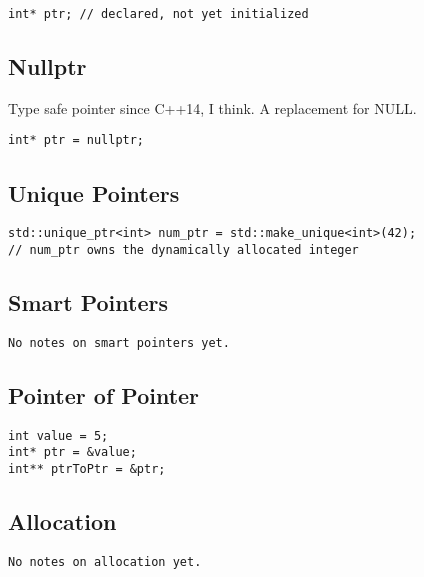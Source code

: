 \begin{verbatim}
int* ptr; // declared, not yet initialized
\end{verbatim}

\subsection{Nullptr}

Type safe pointer since C++14, I think. A replacement for NULL.

\begin{verbatim}
int* ptr = nullptr;
\end{verbatim}

\subsection{Unique Pointers}

\begin{verbatim}
std::unique_ptr<int> num_ptr = std::make_unique<int>(42);
// num_ptr owns the dynamically allocated integer
\end{verbatim}

\subsection{Smart Pointers}
\begin{verbatim}
No notes on smart pointers yet.
\end{verbatim}

\subsection{Pointer of Pointer}

\begin{verbatim}
int value = 5;
int* ptr = &value;
int** ptrToPtr = &ptr;
\end{verbatim}

\subsection{Allocation}
\begin{verbatim}
No notes on allocation yet.
\end{verbatim}

